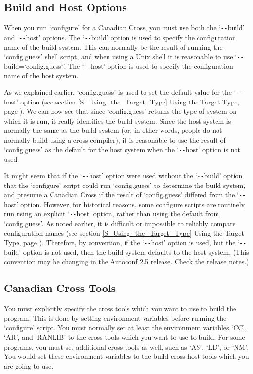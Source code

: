 \subsection{Build and Host Options}

When you run `configure' for a Canadian Cross, you must use both the `\verb+--+build' and `\verb+--+host' options. The `\verb+--+build' option is used to specify the configuration name of the build system. This can normally be the result of running the `config.guess' shell script, and when using a Unix shell it is reasonable to use `\verb+--+build=`config.guess`'. The `\verb+--+host' option is used to specify the configuration name of the host system.

As we explained earlier, `config.guess' is used to set the default value for 
the `\verb+--+host' option
(see section \ref{S_Using_the_Target_Type} Using the Target Type,
page \pageref{S_Using_the_Target_Type}). We can now see that 
since `config.guess' returns the type of system on which it is run, it 
really identifies the build system. Since the host system is normally the same as the build system (or, in other words, people do not normally build using a cross compiler), it is reasonable to use the result of `config.guess' as the default for the host system when the `\verb+--+host' option is not used.

It might seem that if the `\verb+--+host' option were used without 
the `\verb+--+build' option that the `configure' script could 
run `config.guess' to determine the build system, and presume a Canadian 
Cross if the result of `config.guess' differed from the `\verb+--+host' 
option. However, for historical reasons, some configure scripts are 
routinely run using an explicit `\verb+--+host' option, rather than using 
the default from `config.guess'. As noted earlier, it is difficult or 
impossible to reliably compare configuration names
(see section \ref{S_Using_the_Target_Type} Using the Target Type,
page \pageref{S_Using_the_Target_Type}). Therefore, by convention, if 
the `\verb+--+host' option is used, but the `\verb+--+build' option is 
not used, then the build system defaults to the host system.
(This convention may be changing in the Autoconf 2.5 release. 
Check the release notes.) 

\subsection{Canadian Cross Tools}

You must explicitly specify the cross tools which you want to use to build the program. This is done by setting environment variables before running the `configure' script. You must normally set at least the environment variables `CC', `AR', and `RANLIB' to the cross tools which you want to use to build. For some programs, you must set additional cross tools as well, such as `AS', `LD', or `NM'. You would set these environment variables to the build cross host tools which you are going to use.

